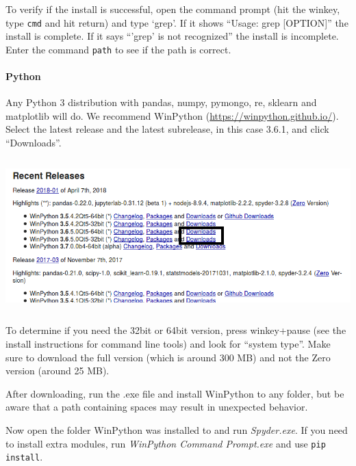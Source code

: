 \documentclass[a4paper]{report}
\begin{document}
To verify if the install is successful, open the command prompt (hit the
winkey, type {\small\texttt{cmd}} and hit return) and type
{\textquoteleft}grep{\textquoteright}. If it shows
{\textquotedblleft}Usage: grep [OPTION]{\textquotedblright} the install
is complete. If it says
{\textquotedblleft}{\textquoteright}grep{\textquoteright} is not
recognized{\textquotedblright} the install is incomplete. Enter the
command {\small\texttt{path}} to see if the path is correct.

\paragraph{Python}
Any Python 3 distribution with pandas, numpy, pymongo, re, sklearn and
matplotlib will do. We recommend WinPython
(\url{https://winpython.github.io/}). Select the latest release and the
latest subrelease, in this case 3.6.1, and click
{\textquotedblleft}Downloads{\textquotedblright}. 

\noindent\begin{center}\includegraphics[width=6.4925in,height=2.3134in]{Syllabus-download-WinPython.png}
\end{center}

To determine if you need the 32bit or 64bit version, press winkey+pause
(see the install instructions for command line tools) and look for
{\textquotedblleft}system type{\textquotedblright}. Make sure to
download the full version (which is around 300 MB) and not the Zero
version (around 25 MB).

After downloading, run the .exe file and install WinPython to any
folder, but be aware that a path containing spaces may result in
unexpected behavior.

Now open the folder WinPython was installed to and run
\textit{Spyder.exe}. If you need to install extra modules, run
\textit{WinPython Command Prompt.exe} and use {\small\texttt{pip install}}.
\end{document}
